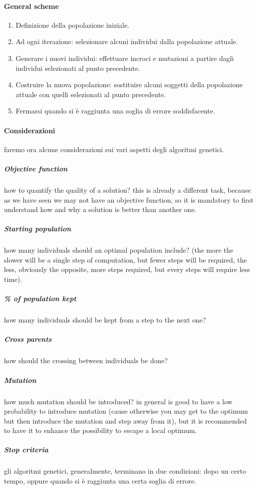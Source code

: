 \documentclass[12pt,a4paper]{report}
\begin{document}
\paragraph{General scheme}
\begin{enumerate}
\item Definizione della popolazione iniziale.
\item Ad ogni iterazione: selezionare alcuni individui dalla popolazione attuale.
\item Generare i nuovi individui: effettuare incroci e mutazioni a partire dagli individui selezionati al punto precedente.
\item Costruire la nuova popolazione: sostituire alcuni soggetti della popolazione attuale con quelli selezionati al punto precedente.
\item Fermarsi quando si è raggiunta una soglia di errore soddisfacente.
\end{enumerate}

\paragraph{Considerazioni}
faremo ora alcune considerazioni sui vari aspetti degli algoritmi genetici.

\subparagraph{Objective function}
how to quantify the quality of a solution? this is already a different task, because as we have seen we may not have an objective function, so it is mandatory to first understand how and why a solution is better than another one.

\subparagraph{Starting population}
how many individuals should an optimal population include? (the more the slower will be a single step of computation, but fewer steps will be required, the less, obviously the opposite, more steps required, but every steps will require less time).

\subparagraph{\% of population kept}
how many individuals should be kept from a step to the next one?

\subparagraph{Cross parents}
how should the crossing between individuals be done?

\subparagraph{Mutation}
how much mutation should be introduced? in general is good to have a low probability to introduce mutation (cause otherwise you may get to the optimum but then introduce the mutation and step away from it), but it is recommended to have it to enhance the possibility to escape a local optimum.

\subparagraph{Stop criteria}
gli algoritmi genetici, generalmente, terminano  in due condizioni: dopo un certo tempo, oppure quando si è raggiunta una certa soglia di errore.
\end{document}

